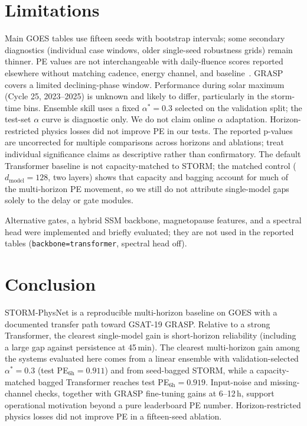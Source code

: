 ﻿\documentclass{ieeeaccess}
\begin{document}
\section{Limitations}
\label{sec:limits}
Main GOES tables use fifteen seeds with bootstrap intervals; some
secondary diagnostics (individual case windows, older single-seed
robustness grids) remain thinner. PE values are not interchangeable with
daily-fluence scores reported elsewhere without matching cadence, energy
channel, and baseline~\cite{b21,b22}. GRASP covers a limited declining-phase
window. Performance during solar maximum (Cycle 25, 2023--2025) is unknown and likely to differ, particularly in the storm-time bins. Ensemble skill uses a fixed \(\alpha^*=0.3\) selected on the
validation split; the test-set \(\alpha\) curve is diagnostic only.
We do not claim online \(\alpha\) adaptation. Horizon-restricted
physics losses did not improve PE in our tests. The reported p-values are uncorrected for multiple comparisons across horizons and ablations; treat individual significance claims as descriptive rather than confirmatory.
The default Transformer baseline is not capacity-matched to STORM; the matched
control ($d_{\mathrm{model}}=128$, two layers) shows that capacity and bagging
account for much of the multi-horizon PE movement, so we still do not attribute
single-model gaps solely to the delay or gate modules.

Alternative gates, a hybrid SSM backbone, magnetopause features, and a spectral head were implemented and briefly evaluated; they are not used in the reported tables (\texttt{backbone=transformer}, spectral head off).

\section{Conclusion}
\label{sec:conclusion}
STORM-PhysNet is a reproducible multi-horizon baseline on GOES with a documented
transfer path toward GSAT-19 GRASP. Relative to a strong Transformer, the
clearest single-model gain is short-horizon reliability (including a large gap
against persistence at 45\,min). The clearest multi-horizon gain among the systems evaluated here comes from a linear
ensemble with validation-selected \(\alpha^*=0.3\) (test PE\(_{6\mathrm{h}}=0.911\))
and from seed-bagged STORM, while a capacity-matched bagged Transformer reaches
test PE\(_{6\mathrm{h}}=0.919\). Input-noise and missing-channel checks, together with GRASP fine-tuning
gains at 6--12\,h, support operational motivation beyond a pure leaderboard PE
number. Horizon-restricted physics losses did not improve PE in a fifteen-seed
ablation.
\end{document}
